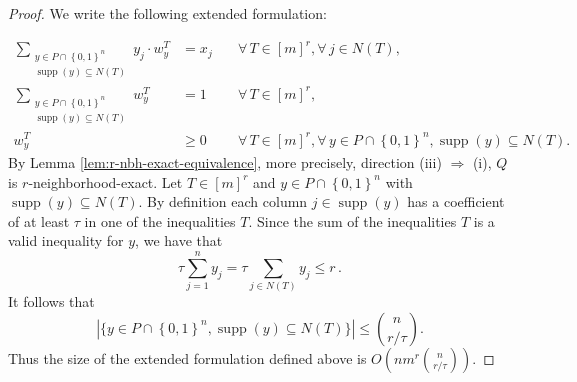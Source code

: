 \documentclass[10pt,a4paper]{amsart}
\DeclareMathOperator{\supp}{supp}
\newcommand{\numrows}{r}
\newcommand{\set}[1]{\left\{#1\right\}}
\begin{document}
\begin{proof}
    We write the following extended formulation:
    
    \begin{align*}
	    \sum_{\substack{y \in P\cap \set{0,1}^n \\ \supp(y) \subseteq N(T)}} y_j \cdot w^T_y &= x_j &\quad \forall\, T \in [m]^r, \forall\, j \in N(T), \\
	    \sum_{\substack{y \in P\cap \set{0,1}^n \\ \supp(y) \subseteq N(T)}} w^T_y &= 1 &\quad \forall\, T \in [m]^r,\\
	    w^T_y &\geq 0 &\quad \forall\, T \in [m]^\numrows, \forall\, y \in P\cap \set{0,1}^n, \supp(y) \subseteq N(T).
    \end{align*}
    By Lemma \ref{lem:r-nbh-exact-equivalence}, more precisely, direction (iii) $\Rightarrow$ (i), $Q$ is $\numrows$-neighborhood-exact. 
	Let $T\in [m]^\numrows$ and $y\in P\cap \set{0,1}^n$ with $\supp(y) \subseteq N(T)$.
	By definition each column $j\in \supp(y)$ has a coefficient of at least $\tau$ in one of the
	inequalities $T$. Since the sum of the inequalities $T$ is a valid inequality for $y$, we have
	that
	\begin{equation*}
		\tau \sum_{j = 1}^n y_j = \tau \sum_{j\in N(T)} y_j \le r \, .
	\end{equation*}
	It follows that
	\begin{equation*}
		|\{y \in P\cap \set{0,1}^n, \supp(y) \subseteq N(T)\}| \le \binom{n}{r / \tau} .
	\end{equation*}
	Thus the size of the extended formulation defined above is $O(n m^r \binom{n}{r/\tau})$.
\end{proof}
\end{document}
